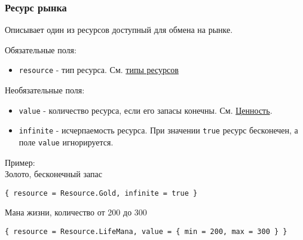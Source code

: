 \subsubsection{Ресурс рынка}
\label{marketresource}
Описывает один из ресурсов доступный для обмена на рынке.

Обязательные поля:
\begin{itemize}
\item \texttt{resource} - тип ресурса. См. \hyperref[resourceTypes]{типы ресурсов}
\end{itemize}

Необязательные поля:
\begin{itemize}
\item \texttt{value} - количество ресурса, если его запасы конечны. См. \hyperref[value]{Ценность}.
\item \texttt{infinite} - исчерпаемость ресурса. При значении \texttt{true} ресурс бесконечен, а поле \texttt{value} игнорируется.
\end{itemize}

Пример:\\
Золото, бесконечный запас

\begin{lstlisting}
{ resource = Resource.Gold, infinite = true }
\end{lstlisting}

Мана жизни, количество от 200 до 300

\begin{lstlisting}
{ resource = Resource.LifeMana, value = { min = 200, max = 300 } }
\end{lstlisting}